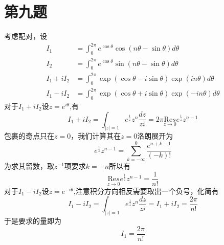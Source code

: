 \documentclass[a4paper]{ctexart}
\begin{document}
\section{第九题}
考虑配对，设
$$
    \begin{aligned}
        I_1      & =\int_0^{2\pi}{e}^{\cos \theta}\cos \left( n\theta -\sin \theta \right) d\theta                    \\
        I_2      & =\int_0^{2\pi}{e}^{\cos \theta}\sin \left( n\theta -\sin \theta \right) d\theta                    \\
        I_1+iI_2 & =\int_0^{2\pi}{\exp \left( \cos \theta -i\sin \theta \right) \exp \left( in\theta \right)}d\theta  \\
        I_1-iI_2 & =\int_0^{2\pi}{\exp \left( \cos \theta +i\sin \theta \right) \exp \left( -in\theta \right)}d\theta
    \end{aligned}
$$
对于$I_1+iI_2$设$z=e^{i\theta}$,有
$$
    I_1+iI_2=\int_{\left| z \right|=1}{e^{\frac{1}{z}}z^n\frac{dz}{zi}=2\pi \underset{z\rightarrow 0}{\text{Re}s}e^{\frac{1}{z}}z^{n-1}}
$$
包裹的奇点只在$z=0$，我们计算其在$z=0$洛朗展开为
$$
    e^{\frac{1}{z}}z^{n-1}=\sum_{k=-\infty}^0{\frac{e^{n+k-1}}{\left( -k \right) !}}
$$
为求其留数，取$z^{-1}$项要求$k=-n$所以有
$$
    \underset{z\rightarrow 0}{\text{Re}s}e^{\frac{1}{z}}z^{n-1}=\frac{1}{n!}
$$
对于$I_1-iI_2$设$z=e^{-i\theta}$,注意积分方向相反需要取出一个负号，化简有
$$
    I_1-iI_2=\int_{\left| z \right|=1}{e^{\frac{1}{z}}z^n\frac{dz}{zi}=}I_1+iI_2=\frac{2\pi}{n!}
$$
于是要求的量即为
$$
    I_1=\frac{2\pi}{n!}
$$
\end{document}
